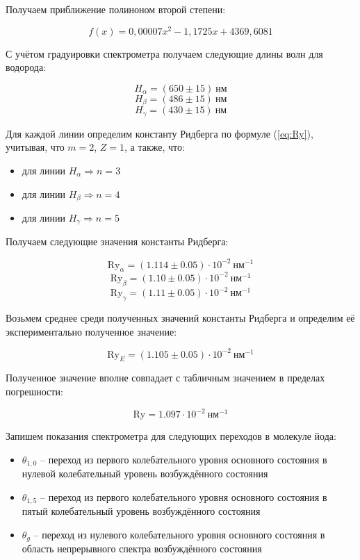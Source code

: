         Получаем приближение полиноном второй степени: 
        
        \[ f(x) = 0,00007x^{2} -1,1725x + 4369,6081 \]


		С учётом градуировки спектрометра получаем следующие длины волн для водорода: 
        
		
		\[	H_{\alpha} = (650\pm 15)\ \text{нм} \]
        \[  H_{\beta} = (486\pm 15)\ \text{нм} \] 
        \[  H_{\gamma} = (430\pm  15)\  \text{нм} \]
		
		
		Для каждой линии определим константу Ридберга по формуле (\ref{eq:Ry}), учитывая, что $m=2$, $Z=1$, а также, что:
        
        \newpage

        \begin{itemize}
            \item для линии $H_{\alpha} \Rightarrow n=3$
            \item для линии $H_{\beta}  \Rightarrow n=4$
            \item для линии $H_{\gamma} \Rightarrow n=5$
        \end{itemize}
        Получаем следующие значения константы Ридберга:
		
	    \[ \text{Ry}_{\alpha}=(1.114\pm 0.05) \cdot 10^{-2} \ \text{нм}^{-1} \] 
        \[ \text{Ry}_{\beta} =(1.10\pm 0.05)\cdot 10^{-2} \ \text{нм}^{-1} \] 
        \[ \text{Ry}_{\gamma}=(1.11\pm 0.05)\cdot 10^{-2}\ \text{нм}^{-1} \]
		
	
		Возьмем среднее среди полученных значений константы Ридберга и определим её экспериментально полученное значение:
		
		\[ \text{Ry}_E=(1.105\pm 0.05)\cdot 10^{-2} ~\text{нм}^{-1} \]

		Полученное значение вполне совпадает с табличным значением в пределах погрешности:

		\[ \text{Ry}=1.097\cdot 10^{-2} \ \text{нм}^{-1} \]
		
		Запишем показания спектрометра для следующих переходов в молекуле йода: 
        \begin{itemize}
            \item $\theta_{1,0}$ -- переход из первого колебательного уровня основного состояния в нулевой колебательный уровень возбуждённого состояния
            \item $\theta_{1,5}$ -- переход из первого колебательного уровня основного состояния в пятый колебательный уровень возбуждённого состояния
            \item $\theta_{g}$ -- переход из нулевого колебательного уровня основного состояния в область непрерывного спектра возбуждённого состояния
        \end{itemize}
        
